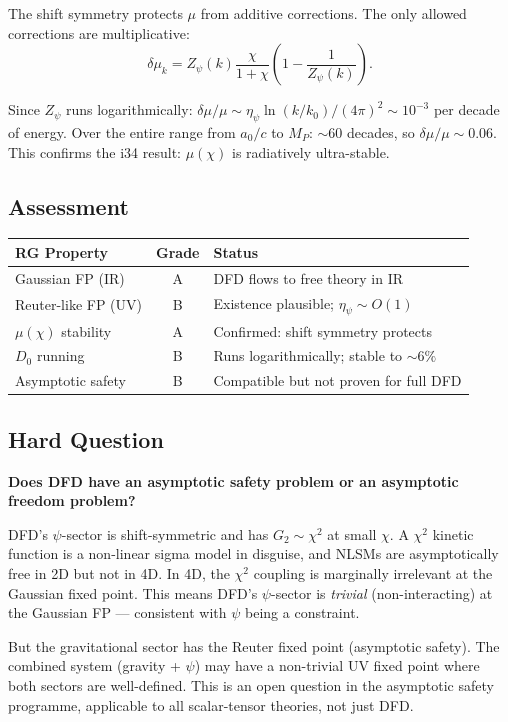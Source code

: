 \documentclass[11pt,a4paper]{article}
\begin{document}
The shift symmetry protects $\mu$ from additive corrections. The only allowed corrections are multiplicative:
\begin{equation}
\delta\mu_k = Z_\psi(k)\frac{\chi}{1+\chi}\left(1 - \frac{1}{Z_\psi(k)}\right).
\end{equation}

Since $Z_\psi$ runs logarithmically: $\delta\mu/\mu \sim \eta_\psi \ln(k/k_0)/(4\pi)^2 \sim 10^{-3}$ per decade of energy. Over the entire range from $a_0/c$ to $M_P$: $\sim 60$ decades, so $\delta\mu/\mu \sim 0.06$. This confirms the i34 result: $\mu(\chi)$ is radiatively ultra-stable.

\subsection{Assessment}

\begin{center}
\begin{tabular}{lcl}
\toprule
\textbf{RG Property} & \textbf{Grade} & \textbf{Status} \\
\midrule
Gaussian FP (IR) & A & DFD flows to free theory in IR \\
Reuter-like FP (UV) & B & Existence plausible; $\eta_\psi \sim O(1)$ \\
$\mu(\chi)$ stability & A & Confirmed: shift symmetry protects \\
$D_0$ running & B & Runs logarithmically; stable to $\sim 6\%$ \\
Asymptotic safety & B & Compatible but not proven for full DFD \\
\bottomrule
\end{tabular}
\end{center}

\subsection{Hard Question}

\textbf{Does DFD have an asymptotic safety problem or an asymptotic freedom problem?}

DFD's $\psi$-sector is shift-symmetric and has $G_2 \sim \chi^2$ at small $\chi$. A $\chi^2$ kinetic function is a non-linear sigma model in disguise, and NLSMs are asymptotically free in 2D but not in 4D. In 4D, the $\chi^2$ coupling is marginally irrelevant at the Gaussian fixed point. This means DFD's $\psi$-sector is \emph{trivial} (non-interacting) at the Gaussian FP --- consistent with $\psi$ being a constraint.

But the gravitational sector has the Reuter fixed point (asymptotic safety). The combined system (gravity + $\psi$) may have a non-trivial UV fixed point where both sectors are well-defined. This is an open question in the asymptotic safety programme, applicable to all scalar-tensor theories, not just DFD.
\end{document}
